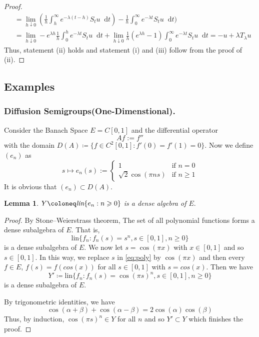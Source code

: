 \documentclass[12pt, reqno]{amsart}
\renewcommand{\geq}{\geqslant}
\newcommand{\1}{\mathbbm 1}
\newcommand*\diff{\mathop{}\!\mathrm{d}}
\theoremstyle{plain}
\newtheorem{lemma}[theorem]{Lemma}
\theoremstyle{definition}
\begin{document}
\begin{proof}
\begin{align*}
   &=\lim_{h \downarrow 0}(\frac{1}{h}\int_{h}^{\infty} e^{-\lambda( t-h)}S_{t} u\diff t)-\frac{1}{h}\int_{0}^{\infty} e^{-\lambda t}S_t u\diff t)\\
   &=\lim_{h \downarrow 0}- e^{\lambda h}\frac{1}{h}\int_{0}^{h} e^{-\lambda t}S_t u\diff t+\lim_{h \downarrow 0}\frac{1}{h}(e^{\lambda h}-1)\int_{0}^{\infty} e^{-\lambda t}S_t u\diff t=-u+\lambda T_{\lambda}u
\end{align*}
Thus, statement (ii) holds and statement (i) and (iii) follow from the proof of (ii).
\end{proof}
\subsection{Examples}
\subsubsection{Diffusion Semigroups(One-Dimenstional).} Consider the Banach Space $E=C[0,1]$ and the differential operator 
\begin{equation*}
Af:=f''
\end{equation*}  
with the domain $D(A)\coloneq\{f\in C^2[0,1]:f'(0)=f'(1)=0\}.$ Now we define $(e_n)$ as
\begin{equation*}
s\mapsto e_n(s) :=\begin{cases}1 & \text{if $n =0$} \\
                                                   \sqrt{2} \cos(\pi n s) & \text{if $n\geq 1$}
                             \end{cases}
\end{equation*}
It is obvious that $(e_n)\subset D(A).$
\begin{lemma}
 $Y\coloneq \emph{lin}\{e_n:n\geq0\}$ is a dense algebra of $E.$
\end{lemma}
\begin{proof}
	By Stone–Weierstrass theorem,  The set of all polynomial functions forms a  dense subalgebra of $E$. That is,
	\begin{equation}\label{eq:poly}
	\text{lin}\{f_n: f_n(s)=s^n, s\in[0,1], n\geq0\}
	\end{equation} is a dense subalgebra of $E.$ We now let $s=\cos(\pi x)$ with $x\in[0,1]$ and so $s\in[0,1]$. In this way, we replace $s$ in \eqref{eq:poly} by $\cos(\pi x)$ and then every $f\in E$, $f(s)=f(cos(x))$ for all $s\in[0,1]$ with $s=cos(x)$. Then we have
	\begin{equation*}
	Y'\coloneq\text{lin}\{f_n: f_n(s)=\cos(\pi s)^n, s\in[0,1], n\geq0\}
	\end{equation*} is a dense subalgebra of $E.$ 
	
	By trigonometric identities, we have
	\begin{equation}\label{eq:trigo}
	\cos(\alpha+\beta)+\cos(\alpha-\beta)=2\cos(\alpha)\cos(\beta)
	\end{equation}
	Thus, by induction, $\cos(\pi s)^n\in Y$ for all $n$ and so $ Y'\subset Y$ which finishes the proof.
\end{proof}
\end{document}
